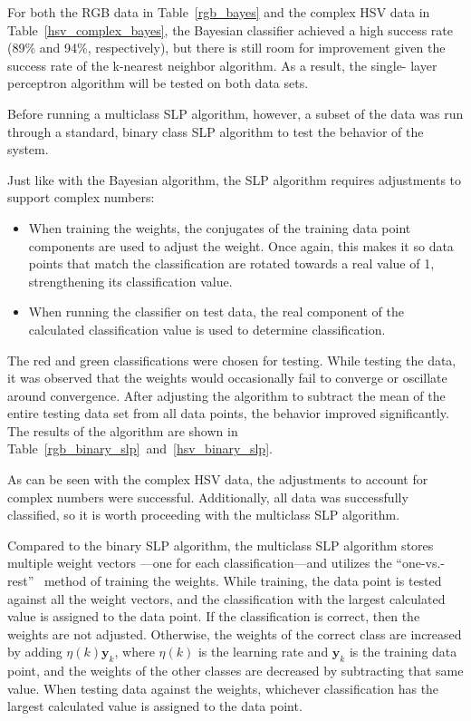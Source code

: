 \documentclass[twoside]{IEEEtran}
\begin{document}
For both the RGB data in Table~\ref{rgb_bayes} and the complex HSV data in Table~\ref{hsv_complex_bayes}, the Bayesian
classifier achieved a high success rate (89\% and 94\%, respectively), but there is still room for
improvement given the success rate of the k-nearest neighbor algorithm. As a result, the single-
layer perceptron algorithm will be tested on both data sets.

Before running a multiclass SLP algorithm, however, a subset of the data was run through a standard, binary class SLP algorithm to test the behavior of
the system.

Just like with the Bayesian algorithm, the SLP algorithm requires adjustments to support
complex numbers:

\begin{itemize}
    \item When training the weights, the conjugates of the training data point components are used
          to adjust the weight. Once again, this makes it so data points that match the classification
          are rotated towards a real value of 1, strengthening its classification value.

    \item When running the classifier on test data, the real component of the calculated
          classification value is used to determine classification.
\end{itemize}

The red and green classifications were chosen for testing. While testing the data, it was observed
that the weights would occasionally fail to converge or oscillate around convergence. After
adjusting the algorithm to subtract the mean of the entire testing data set from all data points, the
behavior improved significantly. The results of the algorithm are shown in Table~\ref{rgb_binary_slp}~and~\ref{hsv_binary_slp}.

As can be seen with the complex HSV data, the adjustments to account for complex numbers
were successful. Additionally, all data was successfully classified, so it is worth proceeding with
the multiclass SLP algorithm.

Compared to the binary SLP algorithm, the multiclass SLP algorithm stores multiple weight vectors
---one for each classification---and utilizes the ``one-vs.-rest''~\cite{bishop} method of training the
weights. While training, the data point is tested against all the weight vectors, and the
classification with the largest calculated value is assigned to the data point. If the classification is
correct, then the weights are not adjusted. Otherwise, the weights of the correct class are
increased by adding \( \eta\left(k\right)\mathbf{y}_k \), where \( \eta\left(k\right) \) is the learning
rate and \( \mathbf{y}_k \) is the training data point, and the weights of the other classes are decreased
by subtracting that same value. When testing data against the weights, whichever classification has the
largest calculated value is assigned to the data point.
\end{document}
